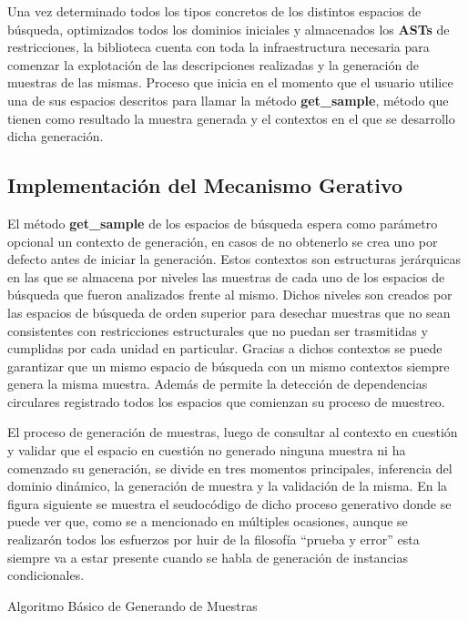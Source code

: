 Una vez determinado todos los tipos concretos de los distintos espacios de búsqueda, optimizados todos los dominios iniciales y
almacenados los {\bf ASTs} de restricciones, la biblioteca cuenta con toda la infraestructura necesaria para comenzar la explotación
de las descripciones realizadas y la generación de muestras de las mismas. Proceso que inicia en el momento que el usuario
utilice una de sus espacios descritos para llamar la método {\bf get\_sample}, método que tienen como resultado la muestra generada y
el contextos en el que se desarrollo dicha generación.

\subsection{Implementación del Mecanismo Gerativo}

El método {\bf get\_sample} de los espacios de búsqueda espera como parámetro opcional un contexto de generación, en casos de no
obtenerlo se crea uno por defecto antes de iniciar la generación. Estos contextos son estructuras jerárquicas en las que se
almacena por niveles las muestras de cada uno de los espacios de búsqueda que fueron analizados frente al mismo. Dichos niveles
son creados por las espacios de búsqueda de orden superior para desechar muestras que no sean consistentes con restricciones
estructurales que no puedan ser trasmitidas y cumplidas por cada unidad en particular. Gracias a dichos contextos se puede
garantizar que un mismo espacio de búsqueda con un mismo contextos siempre genera la misma muestra. Además de permite la
detección de dependencias circulares registrado todos los espacios que comienzan su proceso de muestreo.

El proceso de generación de muestras, luego de consultar al contexto en cuestión y validar que el espacio en cuestión no
generado ninguna muestra ni ha comenzado su generación, se divide en tres momentos principales, inferencia del dominio
dinámico, la generación de muestra y la validación de la misma. En la figura siguiente se muestra el seudocódigo de dicho
proceso generativo donde se puede ver que, como se a mencionado en múltiples ocasiones, aunque se realizarón todos los
esfuerzos por huir de la filosofía “prueba y error” esta siempre va a estar presente cuando se habla de generación de
instancias condicionales.

\begin{algorithm}[H]
    \SetAlgoLined
    \caption{Algoritmo Básico de Generando de Muestras}
\end{algorithm}


